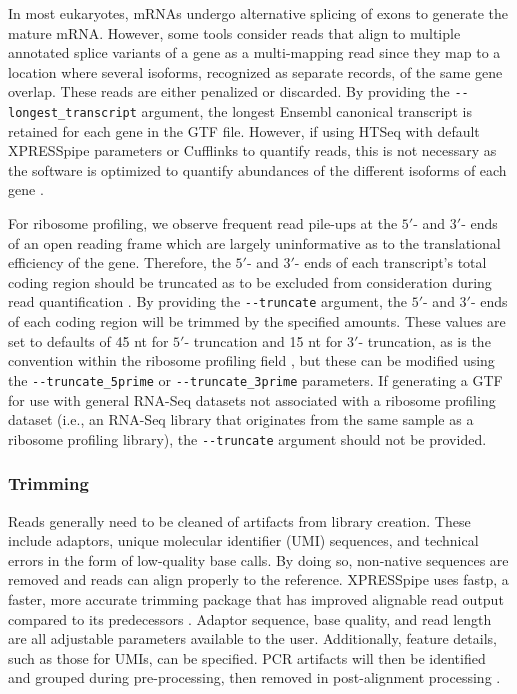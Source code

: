 \documentclass[10pt, oneside]{article}
\begin{document}
In most eukaryotes, mRNAs undergo alternative splicing of exons to generate the mature mRNA. However, some tools consider reads that align to multiple annotated splice variants of a gene as a multi-mapping read since they map to a location where several isoforms, recognized as separate records, of the same gene overlap. These reads are either penalized or discarded. By providing the \texttt{-{}-longest\_transcript} argument, the longest Ensembl canonical transcript \cite{ensembl_canon} is retained for each gene in the GTF file. However, if using HTSeq with default XPRESSpipe parameters or Cufflinks to quantify reads, this is not necessary as the software is optimized to quantify abundances of the different isoforms of each gene \cite{cufflinks}. \par

For ribosome profiling, we observe frequent read pile-ups at the $5'$- and $3'$- ends of an open reading frame which are largely uninformative as to the translational efficiency of the gene. Therefore, the $5'$- and $3'$- ends of each transcript's total coding region should be truncated as to be excluded from consideration during read quantification \cite{ingolia_meth, weinberg_reports}. By providing the \texttt{-{}-truncate} argument, the $5'$- and $3'$- ends of each coding region will be trimmed by the specified amounts. These values are set to defaults of 45 nt for $5'$- truncation and 15 nt for $3'$- truncation, as is the convention within the ribosome profiling field \cite{ingolia_meth}, but these can be modified using the \texttt{-{}-truncate\_5prime} or \texttt{-{}-truncate\_3prime} parameters. If generating a GTF for use with general RNA-Seq datasets not associated with a ribosome profiling dataset (i.e., an RNA-Seq library that originates from the same sample as a ribosome profiling library), the \texttt{-{}-truncate} argument should not be provided.

\subsubsection{Trimming}
Reads generally need to be cleaned of artifacts from library creation. These include adaptors, unique molecular identifier (UMI) sequences, and technical errors in the form of low-quality base calls. By doing so, non-native sequences are removed and reads can align properly to the reference. XPRESSpipe uses fastp, a faster, more accurate trimming package that has improved alignable read output compared to its predecessors \cite{fastp}. Adaptor sequence, base quality, and read length are all adjustable parameters available to the user. Additionally, feature details, such as those for UMIs, can be specified. PCR artifacts will then be identified and grouped during pre-processing, then removed in post-alignment processing \cite{umi, umitools}.
\end{document}
